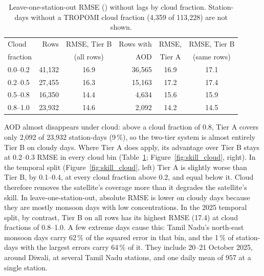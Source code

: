 \begin{table}[!htbp]
    \centering
    \small
    \setlength{\tabcolsep}{3pt}
    \begin{tabular}{l|r|c|r|c|c}
        \hline
        Cloud & Rows & RMSE, Tier B & Rows with & RMSE, & RMSE, Tier B \\
        fraction & & (all rows) & AOD & Tier A & (same rows) \\
        \hline
        0.0--0.2 & 41,132 & 16.9 & 36,565 & 16.9 & 17.1 \\
        0.2--0.5 & 27,455 & 16.3 & 15,163 & 17.2 & 17.4 \\
        0.5--0.8 & 16,350 & 14.4 & 4,634 & 15.6 & 15.9 \\
        0.8--1.0 & 23,932 & 14.6 & 2,092 & 14.2 & 14.5 \\
        \hline
    \end{tabular}
    \caption{Leave-one-station-out RMSE (\ugm{}) without lags by cloud fraction. Station-days without a TROPOMI cloud fraction (4,359 of 113,228) are not shown.}
    \label{tab:cloud}
\end{table}

AOD almost disappears under cloud: above a cloud fraction of 0.8, Tier A covers only 2,092 of
23,932 station-days (9\,\%), so the two-tier system is almost entirely Tier B on cloudy days. Where
Tier A does apply, its advantage over Tier B stays at 0.2--0.3\ugm{} RMSE in every cloud bin
(Table~\ref{tab:cloud}; Figure~\ref{fig:skill_cloud}, right). In the temporal split
(Figure~\ref{fig:skill_cloud}, left) Tier A is slightly worse than Tier B, by 0.1--0.4\ugm{}, at every
cloud fraction above 0.2, and equal below it. Cloud therefore removes the satellite's coverage more
than it degrades the satellite's skill. In leave-one-station-out, absolute RMSE is lower on cloudy
days because they are mostly monsoon days with low concentrations. In the 2025 temporal split,
by contrast, Tier B on all rows has its highest RMSE (17.4\ugm{}) at cloud fractions of 0.8--1.0. A
few extreme days cause this: Tamil Nadu's north-east monsoon days carry 62\,\% of the squared error
in that bin, and the 1\,\% of station-days with the largest errors carry 64\,\% of it. They include
20--21 October 2025, around Diwali, at several Tamil Nadu stations, and one daily mean of
957\ugm{} at a single station.

